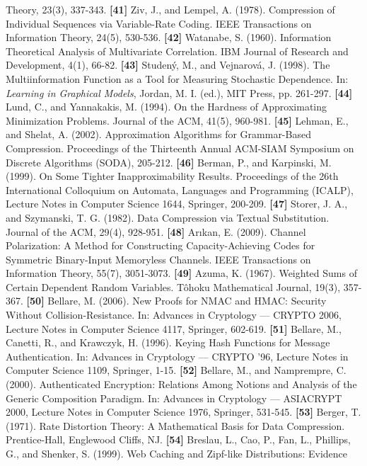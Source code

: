 \documentclass[
]{article}
\begin{document}
Theory, 23(3), 337-343.
\textbf{{[}41{]}} Ziv, J., and Lempel, A. (1978). Compression of
Individual Sequences via Variable-Rate Coding. IEEE Transactions on
Information Theory, 24(5), 530-536.
\textbf{{[}42{]}} Watanabe, S. (1960). Information Theoretical
Analysis of Multivariate Correlation. IBM Journal of Research and
Development, 4(1), 66-82.
\textbf{{[}43{]}} Studen\'y, M., and Vejnarov\'a, J. (1998). The
Multiinformation Function as a Tool for Measuring Stochastic
Dependence. In: \emph{Learning in Graphical Models}, Jordan, M. I.
(ed.), MIT Press, pp. 261-297.
\textbf{{[}44{]}} Lund, C., and Yannakakis, M. (1994). On the
Hardness of Approximating Minimization Problems. Journal of the ACM,
41(5), 960-981.
\textbf{{[}45{]}} Lehman, E., and Shelat, A. (2002). Approximation
Algorithms for Grammar-Based Compression. Proceedings of the
Thirteenth Annual ACM-SIAM Symposium on Discrete Algorithms (SODA),
205-212.
\textbf{{[}46{]}} Berman, P., and Karpinski, M. (1999). On Some
Tighter Inapproximability Results. Proceedings of the 26th
International Colloquium on Automata, Languages and Programming
(ICALP), Lecture Notes in Computer Science 1644, Springer, 200-209.
\textbf{{[}47{]}} Storer, J. A., and Szymanski, T. G. (1982). Data
Compression via Textual Substitution. Journal of the ACM, 29(4),
928-951.
\textbf{{[}48{]}} Ar{\i}kan, E. (2009). Channel Polarization: A Method
for Constructing Capacity-Achieving Codes for Symmetric Binary-Input
Memoryless Channels. IEEE Transactions on Information Theory, 55(7),
3051-3073.
\textbf{{[}49{]}} Azuma, K. (1967). Weighted Sums of Certain Dependent
Random Variables. T\^ohoku Mathematical Journal, 19(3), 357-367.
\textbf{{[}50{]}} Bellare, M. (2006). New Proofs for NMAC and HMAC:
Security Without Collision-Resistance. In: Advances in Cryptology ---
CRYPTO 2006, Lecture Notes in Computer Science 4117, Springer, 602-619.
\textbf{{[}51{]}} Bellare, M., Canetti, R., and Krawczyk, H. (1996).
Keying Hash Functions for Message Authentication. In: Advances in
Cryptology --- CRYPTO '96, Lecture Notes in Computer Science 1109,
Springer, 1-15.
\textbf{{[}52{]}} Bellare, M., and Namprempre, C. (2000). Authenticated
Encryption: Relations Among Notions and Analysis of the Generic
Composition Paradigm. In: Advances in Cryptology --- ASIACRYPT 2000,
Lecture Notes in Computer Science 1976, Springer, 531-545.
\textbf{{[}53{]}} Berger, T. (1971). Rate Distortion Theory: A
Mathematical Basis for Data Compression. Prentice-Hall, Englewood
Cliffs, NJ.
\textbf{{[}54{]}} Breslau, L., Cao, P., Fan, L., Phillips, G., and
Shenker, S. (1999). Web Caching and Zipf-like Distributions: Evidence
\end{document}
